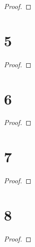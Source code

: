 \documentclass{article}
\begin{document}
\begin{proof}
\end{proof}

\newpage
\section*{5}
\begin{ques}\label{q5}
\end{ques}

\begin{proof}
\end{proof}

\newpage
\section*{6}
\begin{ques}\label{q6}
\end{ques}

\begin{proof}
\end{proof}

\newpage
\section*{7}
\begin{ques}\label{q7}
\end{ques}

\begin{proof}
\end{proof}

\newpage
\section*{8}
\begin{ques}\label{q8}
\end{ques}

\begin{proof}
\end{proof}
\end{document}
